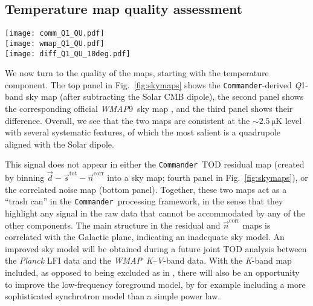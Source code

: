 \documentclass[twocolumn]{aa}
\def\WMAP{\emph{WMAP}}
\def\commander{\texttt{Commander}}
\renewcommand{\d}[0]{\vec{d}}
\newcommand{\n}[0]{\vec{n}}
\newcommand{\s}[0]{\vec{s}}
\newcommand{\K}[0]{\textit K}
\newcommand{\Q}[0]{\textit Q}
\newcommand{\V}[0]{\textit V}
\begin{document}
\subsection{Temperature map quality assessment}


\begin{figure*}
  \centering
	\texttt{[image: comm\_Q1\_QU.pdf]}\\
	\texttt{[image: wmap\_Q1\_QU.pdf]}\\
	\texttt{[image: diff\_Q1\_QU\_10deg.pdf]}
	\caption{(\textit{Top:}) \commander{} \Q1-band polarization
          map, smoothed to $2^\circ$ FWHM. (\textit{Middle:}) Corresponding official \WMAP\ \Q1-band
	  sky map, also smoothed to $2^\circ$ FWHM. (\textit{Bottom:}) \commander{} solution minus \WMAP\ solution, smoothed to $10^\circ$ FWHM.}
	\label{fig:Pskymaps}
\end{figure*}

We now turn to the quality of the maps, starting with the temperature
component. The top panel in Fig.~\ref{fig:skymaps} shows the \commander-derived
\Q1-band sky map (after subtracting the Solar CMB dipole), the second panel
shows the corresponding official \WMAP9\ sky map \citep{bennett2012}, and the
third panel shows their difference. Overall, we see that the two maps are
consistent at the $\sim2.5\,\mathrm{\mu K}$ level with several systematic
features, of which the most salient is a quadrupole aligned with the Solar
dipole.


This signal does not appear in either the \commander\ TOD residual map (created
by binning $\d-\s^{\mathrm{tot}}-\n^{\mathrm{corr}}$ into a sky map; fourth
panel in Fig.~\ref{fig:skymaps}), or the correlated noise map (bottom panel).
Together, these two maps act as a ``trash can'' in the \commander\ processing
framework, in the sense that they highlight any signal in the raw data that
cannot be accommodated by any of the other components. The main structure in
the residual and $\n^\mathrm{corr}$ maps is correlated with the Galactic plane,
indicating an inadequate sky model. An improved sky model will be obtained
during a future joint TOD analysis between the \textit{Planck} LFI data and the
\WMAP\ \K--\V-band data. With the \K-band map included, as opposed to being
excluded as in \citet{bp01}, there will also be an opportunity to improve the
low-frequency foreground model, by for example including a more sophisticated
synchrotron model than a simple power law.
\end{document}
